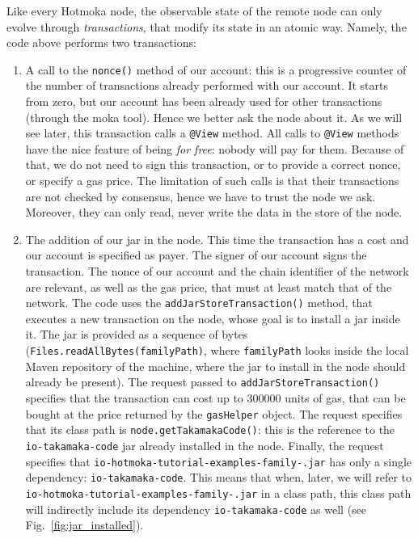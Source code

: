 Like every Hotmoka node, the observable state of the remote node can only evolve through
\emph{transactions}, that modify its state in an atomic way.
Namely, the code above performs two transactions:
%
\begin{enumerate}
\item A call to the \texttt{nonce()} method of our account:
  this is a progressive counter of the number
  of transactions already performed with our account. It starts from zero, but our account has been
  already used for other transactions (through the moka tool). Hence we better ask the
  node about it. As we will see later, this transaction calls a \texttt{@View} method. All calls
  to \texttt{@View} methods have the nice feature of being \emph{for free}:
  nobody will pay for them.
  Because of that, we do not need to sign this transaction, or to provide a correct nonce,
  or specify a gas price. The limitation of such calls is that their transactions are not
  checked by consensus, hence we have to trust the node we ask. Moreover, they can only
  read, never write the data in the store of the node.
\item The addition of our jar in the node. This time the transaction has a cost and our
  account is specified as payer. The signer of our account signs the transaction.
  The nonce of our account and the chain identifier of the network are relevant, as well as the
  gas price, that must at least match that of the network.
  The code uses the \texttt{addJarStoreTransaction()} method, that executes a new transaction
  on the node, whose goal is to install a jar inside it. The jar is provided as a sequence of bytes
  (\texttt{Files.readAllBytes(familyPath)}, where
  \texttt{familyPath} looks inside the local Maven repository
  of the machine, where the jar to install in the node should already be present).
  The request passed to \texttt{addJarStoreTransaction()}
  specifies that the transaction can cost up
  to $300000$ units of gas, that can be bought at the price returned by the
  \texttt{gasHelper} object. The request
  specifies that its class path is \texttt{node.getTakamakaCode()}: this is the reference to the
  \texttt{io-takamaka-code} jar already installed in the node.
  Finally, the request specifies that
  \texttt{io-hotmoka-tutorial-examples-family-\hotmokaVersion{}.jar} has only
  a single dependency: \texttt{io-takamaka-code}. This means that when, later, we will refer to
  \texttt{io-hotmoka-tutorial-examples-family-\hotmokaVersion{}.jar}
  in a class path, this class path will indirectly include its dependency
  \texttt{io-takamaka-code} as well (see Fig.~\ref{fig:jar_installed}).
\end{enumerate}

